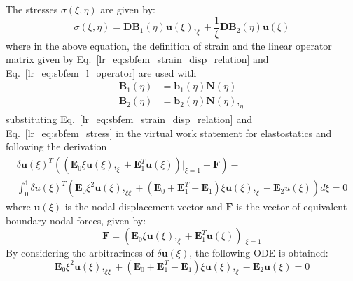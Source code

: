 The stresses $\sigma(\xi,\eta)$ are given by:
\begin{equation}
    \sigma(\xi,\eta) =  \mathbf{DB}_1(\eta) \mathbf{u}(\xi),_{\xi} +
                        \frac{1}{\xi} \mathbf{DB}_2(\eta) \mathbf{u}(\xi)
    \label{lr_eq:sbfem_stress}
\end{equation}
%
where in the above equation, the definition of strain and the linear operator matrix given by Eq.~\ref{lr_eq:sbfem_strain_disp_relation} and Eq.~\ref{lr_eq:sbfem_l_operator} are used with
\begin{equation}
    \begin{aligned}
        \mathbf{B}_1(\eta) &= \mathbf{b}_1(\eta) \mathbf{N}(\eta)    \\
        \mathbf{B}_2(\eta) &= \mathbf{b}_2(\eta) \mathbf{N}(\eta),_{\eta}
        \label{lr_eq:sbfem_captial_b}
    \end{aligned}
\end{equation}
%
substituting Eq.~\ref{lr_eq:sbfem_strain_disp_relation} and Eq.~\ref{lr_eq:sbfem_stress} in the virtual work statement for elastostatics \cite{Deeks2002} and following the derivation
\begin{equation}
    \begin{aligned}
        \delta \mathbf{u}(\xi)^{T} \left(
            (\mathbf{E}_0 \xi \mathbf{u}(\xi),_{\xi}
            + \mathbf{E}_1^T \mathbf{u}(\xi))|_{\xi=1}
            - \mathbf{F}
        \right) - \\
        \int_0^1 \delta u(\xi)^T\left(
            \mathbf{E}_0 \xi^2 \mathbf{u}(\xi),_{\xi\xi} + (\mathbf{E}_0 + \mathbf{E}_1^T - \mathbf{E}_1) \xi \mathbf{u}(\xi),_{\xi}
            - \mathbf{E}_2 u(\xi)
        \right) d\xi = 0
    \end{aligned}
    \label{lr_eq:sbfem_virtual_work}
\end{equation}
%
where $\mathbf{u}(\xi)$ is the nodal displacement vector and $\mathbf{F}$ is the vector of equivalent boundary nodal forces, given by:
\begin{equation}
    \mathbf{F} = (\mathbf{E}_0 \xi \mathbf{u}(\xi),_{\xi} + \mathbf{E}_1^T \mathbf{u}(\xi))|_{\xi=1}
    \label{lr_eq:sbfem_nodal forces}
\end{equation}
%
By considering the arbitrariness of $\delta \mathbf{u}(\xi)$, the following ODE is obtained:
\begin{equation}
    \mathbf{E}_0 \xi^2 \mathbf{u}(\xi),_{\xi\xi} + (\mathbf{E}_0 + \mathbf{E}_1^T - \mathbf{E}_1)\xi \mathbf{u}(\xi),_{\xi} - \mathbf{E}_2 \mathbf{u}(\xi) = 0
    \label{lr_eq:sbfem_ODE}
\end{equation}
